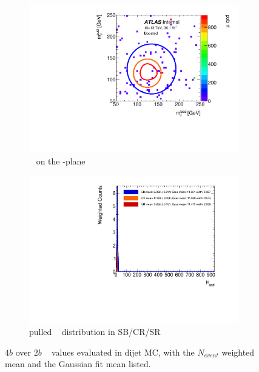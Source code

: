 \begin{figure}[htbp!]
\centering
\captionsetup{justification=centering}
	\hspace{-1cm}
    \begin{subfigure}[b]{0.4\textwidth}
        \includegraphics[width=\textwidth,angle=-90]{figures/boosted/AppendixMuqcdstudy/QCD_FourTag_Incl_mH0H1.pdf}
        \caption{\muqcd~ on the \mleadJ-\msublJ plane}
        \label{fig:app-muqcd-4b-2d-qcd}
    \end{subfigure}
    \quad \quad \quad \quad 
    \begin{subfigure}[b]{0.4\textwidth}
        \includegraphics[width=\textwidth,angle=-90]{figures/boosted/AppendixMuqcdstudy/QCD_FourTag_Incl_mH0H1_pull.pdf}
        \caption{pulled \muqcd~ distribution in SB/CR/SR}
        \label{fig:app-muqcd-4b-pull-qcd}
    \end{subfigure}
\caption{$4b$ over $2b$ \muqcd~ values evaluated in dijet MC, with the $N_{event}$ weighted mean and the Gaussian fit mean listed.}
\label{fig:app-muqcd-4b-qcd}
\end{figure}
